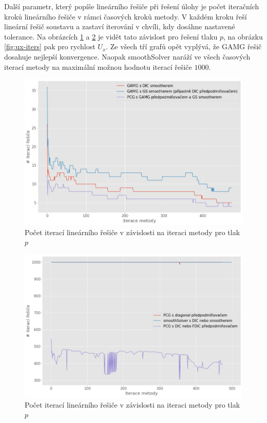 \documentclass[a4paper,12pt]{report}
\theoremstyle{remark}
\begin{document}
Další parametr, který popíše  lineárního řešiče při řešení úlohy je počet iteračních kroků lineárního řešiče v rámci časových kroků metody. V každém kroku řeší lineární řešič soustavu a zastaví iterování v chvíli, kdy dosáhne nastavené tolerance. Na obrázcích \ref{fig:p-iters-1} a \ref{fig:p-iters-2} je vidět tato závislost pro řešení tlaku $p$, na obrázku \ref{fig:ux-iters} pak pro rychlost $U_x$. Ze všech tří grafů opět vyplývá, že GAMG řešič dosahuje nejlepší konvergence. Naopak smoothSolver naráží ve všech časových iterací metody na maximální možnou hodnotu iterací řešiče $1000$.

\begin{figure}[H]
	\centering
	\includegraphics[width=1\linewidth]{p-solver-iters-1.png}
	\caption{Počet iterací lineárního řešiče v závislosti na iteraci metody pro tlak $p$}
	\label{fig:p-iters-1}
\end{figure}

\begin{figure}[H]
	\centering
	\includegraphics[width=1\linewidth]{p-solver-iters-2.png}
	\caption{Počet iterací lineárního řešiče v závislosti na iteraci metody pro tlak $p$}
	\label{fig:p-iters-2}
\end{figure}
\end{document}
